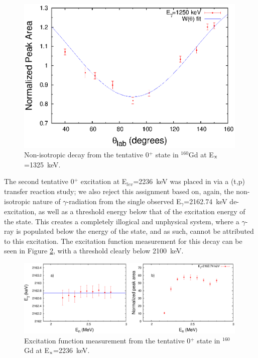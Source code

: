 \begin{center}
\begin{figure}[h!]
\includegraphics[width=0.99\textwidth]{figures/1250_Gd.eps}
\caption{Non-isotropic decay from the tentative 0$^+$ state in $^{160}$Gd at E$_{\rm x}$=1325~keV. \label{fig:160Gd_1250_noniso}}
\end{figure}
\end{center}

The second tentative 0$^+$ excitation at E$_{lev}$=2236~keV was placed in \cite{Lovhoiden_160pt} via a (t,p) transfer reaction study; we also reject this assignment based on, again, the non-isotropic nature of $\gamma$-radiation from the single observed E$_\gamma$=2162.74~keV de-excitation, as well as a threshold energy below that of the excitation energy of the state. This creates a completely illogical and unphysical system, where a $\gamma$-ray is populated below the energy of the state, and as such, cannot be attributed to this excitation. The excitation function measurement for this decay can be seen in Figure \ref{fig:160Gd_2163_exfGd}, with a threshold clearly below 2100~keV.

\begin{center}
\begin{figure}[h!]
\includegraphics[width=0.99\textwidth]{figures/2163_exfGd.eps}
\caption{Excitation function measurement from the tentative 0$^+$ state in $^{160}$Gd at E$_{\rm x}$=2236~keV. \label{fig:160Gd_2163_exfGd}}
\end{figure}
\end{center}


